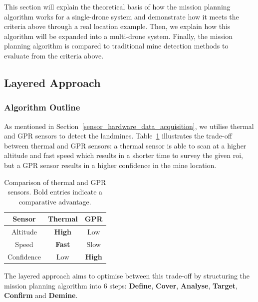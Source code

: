 This section will explain the theoretical basis of how the mission planning algorithm works for a single-drone system and demonstrate how it meets the criteria above through a real location example. Then, we explain how this algorithm will be expanded into a multi-drone system. Finally, the mission planning algorithm is compared to traditional mine detection methods to evaluate from the criteria above.  

\subsection{Layered Approach}
\label{sec:msp_layered_approach}

\subsubsection{Algorithm Outline}

As mentioned in Section~\ref{sensor_hardware_data_acquisition}, we utilise thermal and \gls{GPR} sensors to detect the landmines. Table~\ref{tab:thermal_vs_gpr} illustrates the trade-off between thermal and \gls{GPR} sensors: a thermal sensor is able to scan at a higher altitude and fast speed which results in a shorter time to survey the given \gls{roi}, but a \gls{GPR} sensor results in a higher confidence in the mine location. 

\begin{table}[h!]
    \centering
    \begin{tabular}{| c || c | c |}
        \hline
        Sensor & Thermal & \gls{GPR} \\
        \hline\hline
        Altitude & \textbf{High} & Low \\
        \hline
        Speed & \textbf{Fast} & Slow \\
        \hline
        Confidence & Low & \textbf{High} \\
        \hline
    \end{tabular}
    \caption[Comparison of Thermal and GPR Sensors]
    {Comparison of thermal and \gls{GPR} sensors. Bold entries indicate a comparative advantage.}
    \label{tab:thermal_vs_gpr}
\end{table}

The layered approach aims to optimise between this trade-off by structuring the mission planning algorithm into 6 steps: \textbf{Define}, \textbf{Cover}, \textbf{Analyse}, \textbf{Target}, \textbf{Confirm} and \textbf{Demine}. 

